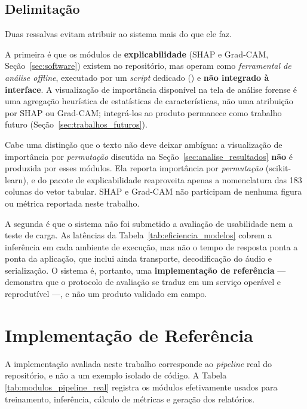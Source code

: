 \documentclass[12pt,a4paper]{article}
\begin{document}
\subsection{Delimitação}

Duas ressalvas evitam atribuir ao sistema mais do que ele faz.

A primeira é que os módulos de \textbf{explicabilidade} (SHAP e Grad-CAM,
Seção~\ref{sec:software}) existem no repositório, mas operam como
\emph{ferramental de análise offline}, executado por um \textit{script}
dedicado () e
\textbf{não integrado à interface}. A visualização de importância disponível na
tela de análise forense é uma agregação heurística de estatísticas de
características, não uma atribuição por SHAP ou Grad-CAM; integrá-los ao
produto permanece como trabalho futuro (Seção~\ref{sec:trabalhos_futuros}).

Cabe uma distinção que o texto não deve deixar ambígua: a visualização de
importância por \emph{permutação} discutida na Seção~\ref{sec:analise_resultados}
\textbf{não} é produzida por esses módulos. Ela reporta importância por
\emph{permutação} (scikit-learn), e do
pacote de explicabilidade reaproveita apenas a nomenclatura das \num{183}
colunas do vetor tabular. SHAP e Grad-CAM não participam de nenhuma figura ou
métrica reportada neste trabalho.

A segunda é que o sistema não foi submetido a avaliação de usabilidade nem a
teste de carga. As latências da Tabela~\ref{tab:eficiencia_modelos} cobrem a
inferência em cada ambiente de execução, mas não o tempo de resposta ponta a
ponta da aplicação, que inclui ainda transporte, decodificação do áudio e
serialização. O sistema é, portanto, uma \textbf{implementação de
	referência} --- demonstra que o protocolo de avaliação se traduz em um serviço
operável e reprodutível ---, e não um produto validado em campo.

\newpage


\section{Implementação de Referência}

A implementação avaliada neste trabalho corresponde ao \textit{pipeline} real do
repositório, e não a um exemplo isolado de código. A Tabela
\ref{tab:modulos_pipeline_real} registra os módulos efetivamente usados para
treinamento, inferência, cálculo de métricas e geração dos relatórios.
\end{document}
